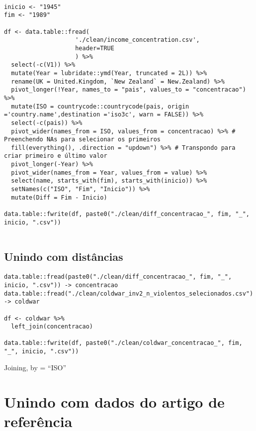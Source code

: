 \documentclass[11pt]{article}
\begin{document}
\begin{verbatim}

inicio <- "1945"
fim <- "1989"
    
df <- data.table::fread(
                    './clean/income_concentration.csv',
                    header=TRUE
                    ) %>%
  select(-c(V1)) %>%
  mutate(Year = lubridate::ymd(Year, truncated = 2L)) %>%
  rename(UK = United.Kingdom, `New Zealand` = New.Zealand) %>%
  pivot_longer(!Year, names_to = "pais", values_to = "concentracao") %>% 
  mutate(ISO = countrycode::countrycode(pais, origin ='country.name',destination ='iso3c', warn = FALSE)) %>%
  select(-c(pais)) %>%
  pivot_wider(names_from = ISO, values_from = concentracao) %>% # Preenchendo NAs para selecionar os primeiros
  fill(everything(), .direction = "updown") %>% # Transpondo para criar primeiro e último valor
  pivot_longer(-Year) %>%
  pivot_wider(names_from = Year, values_from = value) %>%
  select(name, starts_with(fim), starts_with(inicio)) %>%
  setNames(c("ISO", "Fim", "Inicio")) %>%
  mutate(Diff = Fim - Inicio)

data.table::fwrite(df, paste0("./clean/diff_concentracao_", fim, "_", inicio, ".csv"))
    
\end{verbatim}



\subsection*{Unindo com distâncias}
\label{sec:org5b665e2}

\begin{verbatim}
data.table::fread(paste0("./clean/diff_concentracao_", fim, "_", inicio, ".csv")) -> concentracao
data.table::fread("./clean/coldwar_inv2_n_violentos_selecionados.csv") -> coldwar

df <- coldwar %>%
  left_join(concentracao)

data.table::fwrite(df, paste0("./clean/coldwar_concentracao_", fim, "_", inicio, ".csv"))
\end{verbatim}

Joining, by = ``ISO''


\section*{Unindo com dados do artigo de referência}
\label{sec:org8489b73}
\end{document}
